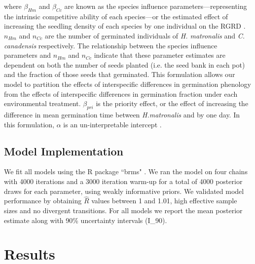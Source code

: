 \documentclass{article}[11pt]
\begin{document}
where  $\beta_{Hm}$ and $\beta_{Cc}$ are known as the species influence parameters---representing the intrinsic competitive ability of each species---or the estimated effect of increasing the seedling density of each species by one individual on the RGRD \citep{Connolly2005}. $n_{Hm}$ and $n_{Cc}$ are the number of germinated individuals of \textit{H. matronalis} and \textit{C. canadensis} respectively. The relationship between the species influence parameters and $n_{Hm}$ and $n_{Cc}$ indicate that these parameter estimates are dependent on both the number of seeds planted (i.e. the seed bank in each pot) and the fraction of those seeds that germinated. This formulation allows our model to partition the effects of interspecific differences in germination phenology from the effects of interspecific differences in germination fraction under each environmental treatment. $\beta_{pri}$ is the priority effect, or the effect of increasing the difference in mean germination time between  \textit{H.matronalis} and  by one day.  In this formulation, $\alpha$ is an un-interpretable intercept \citep{Connolly2005}.

\subsection*{Model Implementation}
\noindent We fit all models using the R package ``brms" \citep{Burkner2018}.  We ran the model on four chains with 4000 iterations and a 3000 iteration warm-up for a total of 4000 posterior draws for each parameter, using weakly informative priors. We validated model performance by obtaining $\hat{R}$ values between 1 and 1.01, high effective sample sizes and no divergent transitions. For all models we report the mean posterior estimate along with 90\% uncertainty intervals (I_{90}).

\section*{Results}
\end{document}
